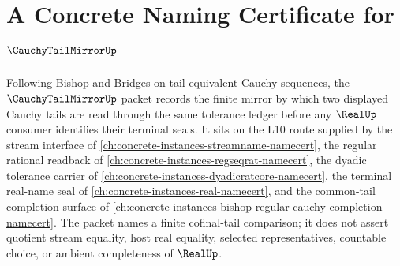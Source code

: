 \chapter{A Concrete Naming Certificate for $\CauchyTailMirrorUp$}
\label{ch:concrete-instances-cauchy-tail-mirror-namecert}

Following Bishop and Bridges on tail-equivalent Cauchy sequences, the $\CauchyTailMirrorUp$ packet records the finite mirror by which two displayed Cauchy tails are read through the same tolerance ledger before any $\RealUp$ consumer identifies their terminal seals. It sits on the L10 route supplied by the stream interface of \autoref{ch:concrete-instances-streamname-namecert}, the regular rational readback of \autoref{ch:concrete-instances-regseqrat-namecert}, the dyadic tolerance carrier of \autoref{ch:concrete-instances-dyadicratcore-namecert}, the terminal real-name seal of \autoref{ch:concrete-instances-real-namecert}, and the common-tail completion surface of \autoref{ch:concrete-instances-bishop-regular-cauchy-completion-namecert}. The packet names a finite cofinal-tail comparison; it does not assert quotient stream equality, host real equality, selected representatives, countable choice, or ambient completeness of $\RealUp$.

